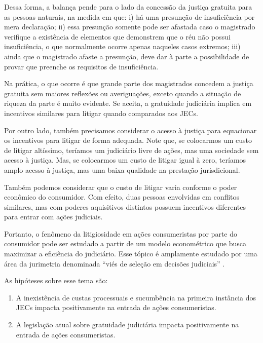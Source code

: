 \documentclass[]{report}
\providecommand{\tightlist}{%
  \setlength{\itemsep}{0pt}\setlength{\parskip}{0pt}}
\begin{document}
Dessa forma, a balança pende para o lado da concessão da justiça
gratuita para as pessoas naturais, na medida em que: i) há uma presunção
de insuficiência por mera declaração; ii) essa presunção somente pode
ser afastada caso o magistrado verifique a existência de elementos que
demonstrem que o réu não possui insuficiência, o que normalmente ocorre
apenas naqueles casos extremos; iii) ainda que o magistrado afaste a
presunção, deve dar à parte a possibilidade de provar que preenche os
requisitos de insuficiência.

Na prática, o que ocorre é que grande parte dos magistrados concedem a
justiça gratuita sem maiores reflexões ou averiguações, exceto quando a
situação de riqueza da parte é muito evidente. Se aceita, a gratuidade
judiciária implica em incentivos similares para litigar quando
comparados aos JECs.

Por outro lado, também precisamos considerar o acesso à justiça para
equacionar os incentivos para litigar de forma adequada. Note que, se
colocarmos um custo de litigar altíssimo, teríamos um judiciário livre
de ações, mas uma sociedade sem acesso à justiça. Mas, se colocarmos um
custo de litigar igual à zero, teríamos amplo acesso à justiça, mas uma
baixa qualidade na prestação jurisdicional.

Também podemos considerar que o custo de litigar varia conforme o poder
econômico do consumidor. Com efeito, duas pessoas envolvidas em
conflitos similares, mas com poderes aquisitivos distintos possuem
incentivos diferentes para entrar com ações judiciais.

Portanto, o fenômeno da litigiosidade em ações consumeristas por parte
do consumidor pode ser estudado a partir de um modelo econométrico que
busca maximizar a eficiência do judiciário. Esse tópico é amplamente
estudado por uma área da jurimetria denominada ``viés de seleção em
decisões judiciais'' \citep{priest1984selection}.

As hipóteses sobre esse tema são:

\begin{enumerate}
\def\labelenumi{\arabic{enumi}.}
\tightlist
\item
  A inexistência de custas processuais e sucumbência na primeira
  instância dos JECs impacta positivamente na entrada de ações
  consumeristas.
\item
  A legislação atual sobre gratuidade judiciária impacta positivamente
  na entrada de ações consumeristas.
\end{enumerate}
\end{document}
